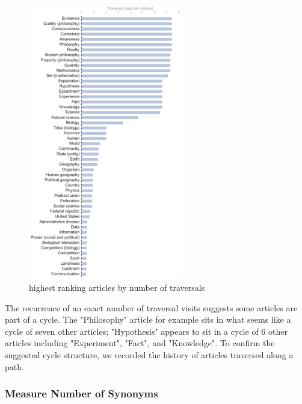 \documentclass[twoside]{article}
\newcommand{\green}[1]{{\leavevmode\color{javagreen}{#1}}} %
\newcommand{\red}[1]{{\leavevmode\color{sred}{#1}}} %
\begin{document}
\begin{figure}[H]
\centering
    \caption{highest ranking articles by number of traversals}
        \includegraphics[width=0.6\textwidth]{graphics/articles_ranked.png}
\end{figure}


The recurrence of an exact number of traversal visits suggests some articles are part of a cycle. 
The "Philosophy" article for example sits in what seems like a cycle of seven other articles; "Hypothesis" appears to sit in a 
cycle of 6 other articles including "Experiment", "Fact", and "Knowledge".
To confirm the suggested cycle structure, we recorded the history of articles traversed along a path. 


\subsubsection{Measure Number of Synonyms}

\green{
number of synonyms
top 100 articles, average:
5.0 
9.1 (excluding zero)
median: 7.0

remaining articles average:
0.5
5.8 (excluding zero)
median: 3.0
}
\red{
[[ add synonym analysis to support characterization of high ranking articles
as abstract foundational notions. \\
- idea is to correlate the number of synonyms a word has with its traversal visit rank.
]]}
\end{document}
